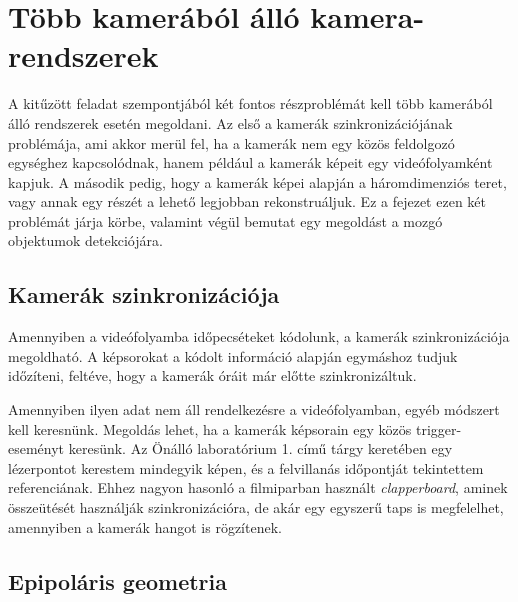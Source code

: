 \chapter{Több kamerából álló kamera-rendszerek \label{chapter2}}

A kitűzött feladat szempontjából két fontos részproblémát kell több kamerából álló rendszerek esetén megoldani. Az első a kamerák szinkronizációjának problémája, ami akkor merül fel, ha a kamerák nem egy közös feldolgozó egységhez kapcsolódnak, hanem például a kamerák képeit egy videófolyamként kapjuk. A második pedig, hogy a kamerák képei alapján a háromdimenziós teret, vagy annak egy részét a lehető legjobban rekonstruáljuk. Ez a fejezet ezen két problémát járja körbe, valamint végül bemutat egy megoldást a mozgó objektumok detekciójára.


\section{Kamerák szinkronizációja}


Amennyiben a videófolyamba időpecséteket kódolunk, a kamerák szinkronizációja megoldható. A képsorokat a kódolt információ alapján egymáshoz tudjuk időzíteni, feltéve, hogy a kamerák óráit már előtte szinkronizáltuk.

Amennyiben ilyen adat nem áll rendelkezésre a videófolyamban, egyéb módszert kell keresnünk. Megoldás lehet, ha a kamerák képsorain egy közös trigger-eseményt keresünk. Az Önálló laboratórium 1. című tárgy keretében \cite{onlab-1} egy lézerpontot kerestem mindegyik képen, és a felvillanás időpontját tekintettem referenciának. Ehhez nagyon hasonló a filmiparban használt \textit{clapperboard}, aminek összeütését használják szinkronizációra, de akár egy egyszerű taps is megfelelhet, amennyiben a kamerák hangot is rögzítenek.


\section{Epipoláris geometria \label{sec:epipolar}}

